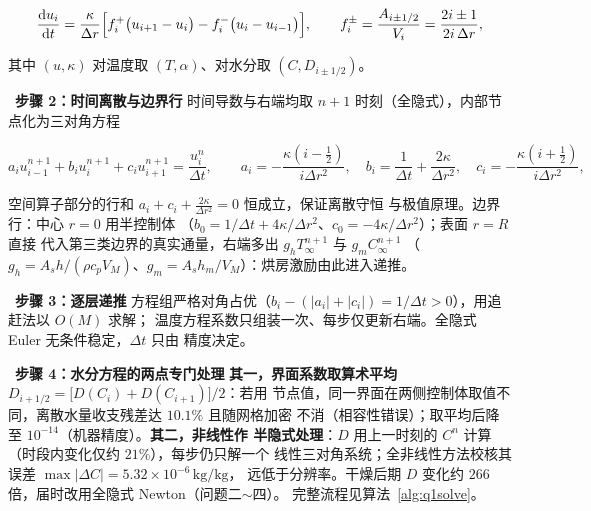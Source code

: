 \documentclass[withoutpreface,bwprint]{cumcmthesis} %
\begin{document}
\begin{equation}
\frac{\mathrm{d}u_i}{\mathrm{d}t}=\frac{\kappa}{\Delta r}
\Bigl[f_i^{+}\bigl(u_{i+1}-u_i\bigr)-f_i^{-}\bigl(u_i-u_{i-1}\bigr)\Bigr],
\qquad f_i^{\pm}=\frac{A_{i\pm1/2}}{V_i}=\frac{2i\pm1}{2i\,\Delta r},
\end{equation}

其中 $(u,\kappa)$ 对温度取 $(T,\alpha)$、对水分取 $(C,D_{i\pm1/2})$。

\noindent{}\ \textbf{步骤 2：时间离散与边界行}
时间导数与右端均取 $n+1$ 时刻（全隐式），内部节点化为三对角方程

\begin{equation}
a_iu_{i-1}^{n+1}+b_iu_i^{n+1}+c_iu_{i+1}^{n+1}=\frac{u_i^n}{\Delta t},\qquad
a_i=-\frac{\kappa(i-\tfrac12)}{i\Delta r^2},\quad
b_i=\frac{1}{\Delta t}+\frac{2\kappa}{\Delta r^2},\quad
c_i=-\frac{\kappa(i+\tfrac12)}{i\Delta r^2},
\end{equation}

空间算子部分的行和 $a_i+c_i+\frac{2\kappa}{\Delta r^2}=0$ 恒成立，保证离散守恒
与极值原理。边界行：中心 $r=0$ 用半控制体
（$b_0=1/\Delta t+4\kappa/\Delta r^2$、$c_0=-4\kappa/\Delta r^2$）；表面 $r=R$ 直接
代入第三类边界的真实通量，右端多出 $g_hT_\infty^{n+1}$ 与 $g_mC_\infty^{n+1}$
（$g_h=A_sh/(\rho c_pV_M)$、$g_m=A_sh_m/V_M$）：烘房激励由此进入递推。

\noindent{}\ \textbf{步骤 3：逐层递推}
方程组严格对角占优（$b_i-(|a_i|+|c_i|)=1/\Delta t>0$），用追赶法以 $O(M)$ 求解；
温度方程系数只组装一次、每步仅更新右端。全隐式 Euler 无条件稳定，$\Delta t$ 只由
精度决定。

\noindent{}\ \textbf{步骤 4：水分方程的两点专门处理}
\textbf{其一，界面系数取算术平均} $D_{i+1/2}=\bigl[D(C_i)+D(C_{i+1})\bigr]/2$：若用
节点值，同一界面在两侧控制体取值不同，离散水量收支残差达 $10.1\%$ 且随网格加密
不消（相容性错误）；取平均后降至 $10^{-14}$（机器精度）。\textbf{其二，非线性作
半隐式处理}：$D$ 用上一时刻的 $C^n$ 计算（时段内变化仅约 $21\%$），每步仍只解一个
线性三对角系统；全非线性方法校核其误差 $\max|\Delta C|=5.32\times10^{-6}\,\mathrm{kg/kg}$，
远低于分辨率。干燥后期 $D$ 变化约 $266$ 倍，届时改用全隐式 Newton（问题二$\sim$四）。
完整流程见算法~\ref{alg:q1solve}。
\end{document}
